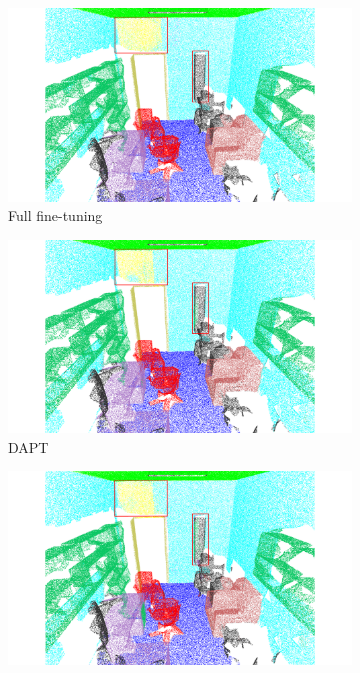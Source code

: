\begin{figure}
    \centering
    \begin{subfigure}{0.235\textwidth}
        \centering
        \includegraphics[width=\linewidth]{fig/S3DIS/PointMAE.pdf}
        \caption{Full fine-tuning}
        \label{fig:s3dis1}
    \end{subfigure}
    \hfill
    \begin{subfigure}{0.235\textwidth}
        \centering
        \includegraphics[width=\linewidth]{fig/S3DIS/DAPT.pdf}
        \caption{DAPT~\cite{zhou2024dynamic}}
        \label{fig:s3dis2}
    \end{subfigure}
    \hfill
    \begin{subfigure}{0.235\textwidth}
        \centering
        \includegraphics[width=\linewidth]{fig/S3DIS/IDPT.pdf}

\end{subfigure}
\end{figure}
